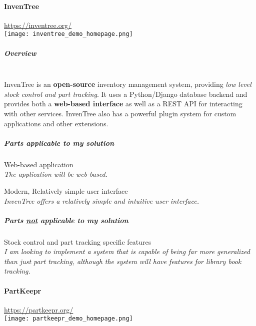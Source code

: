 \documentclass[../../../main.tex]{subfiles}
\begin{document}

\paragraph{InvenTree}
\url{https://inventree.org/}\\


\texttt{[image: inventree\_demo\_homepage.png]}

\subparagraph{Overview}

\noindent\\ InvenTree is an \textbf{open-source} inventory management system, providing \textit{low level stock control and part tracking}.
It uses a Python/Django database backend and provides both a \textbf{web-based interface} as well as a REST API for interacting with other services.
InvenTree also has a powerful plugin system for custom applications and other extensions. \\

\subparagraph{Parts applicable to my solution\\}

\begin{outline}
    \1 Web-based application\\
    \textit{The application will be web-based.}

    \1 Modern, Relatively simple user interface\\
    \textit{InvenTree offers a relatively simple and intuitive user interface.}
\end{outline}

\subparagraph{Parts \underline{not} applicable to my solution\\}

\begin{outline}
    \1 Stock control and part tracking specific features\\
    \textit{I am looking to implement a system that is capable of being far more generalized than just part tracking, although the system will have features for library book tracking.}
\end{outline}

\pagebreak

\paragraph{PartKeepr}
\url{https://partkeepr.org/}\\

\texttt{[image: partkeepr\_demo\_homepage.png]}
\end{document}
